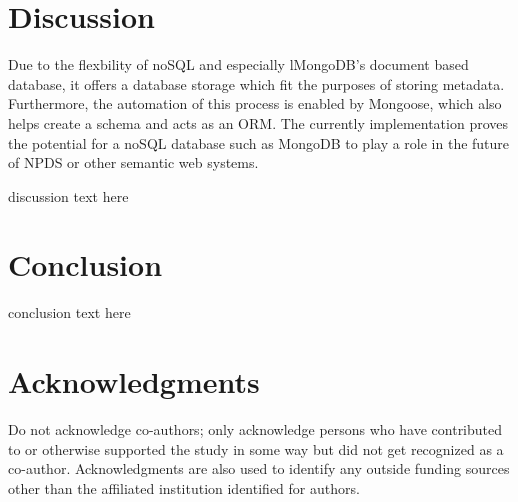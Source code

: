 \documentclass[10pt,twocolumn,twoside]{article}
\begin{document}
\section*{Discussion}
	Due to the flexbility of noSQL and especially lMongoDB's document based database, it offers a database storage which fit the purposes of storing metadata. Furthermore, the automation of this process is enabled by Mongoose, which also helps create a schema and acts as an ORM. The currently implementation proves the potential for a noSQL database such as MongoDB to play a role in the future of NPDS or other semantic web systems. 

\label{secDiscussion}
discussion text here


\section*{Conclusion}
\label{secConclusion}
conclusion text here


\section*{Acknowledgments}
Do not acknowledge co-authors; only acknowledge persons who have contributed
to or otherwise supported the study in some way but did not get recognized as a co-author.
Acknowledgments are also used to identify any outside funding sources other than
the affiliated institution identified for authors.
\end{document}
